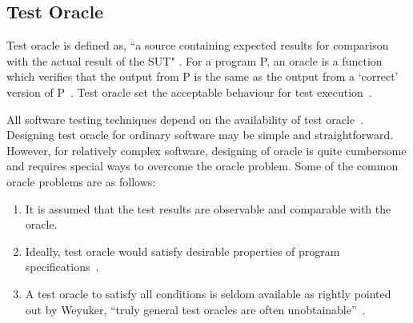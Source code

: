 



\subsection{Test Oracle}
Test oracle is defined as, ``a source containing expected results for comparison with the actual result of the SUT" \cite{ahmed2010software}. For a program P, an oracle is a function which verifies that the output from P is the same as the output from a ‘correct’ version of P~\cite{howden1986}. Test oracle set the acceptable behaviour for test execution~\cite{baresi2001test}. 

All software testing techniques depend on the availability of test oracle~\cite{gaudel2010software}. Designing test oracle for ordinary software may be simple and straightforward. However, for relatively complex software, designing of oracle is quite cumbersome and requires special ways to overcome the oracle problem. Some of the common oracle problems are as follows:
\begin{enumerate}
\item It is assumed that the test results are observable and comparable with the oracle.
\item Ideally, test oracle would satisfy desirable properties of program specifications~\cite{baresi2001test}.
\item A test oracle to satisfy all conditions is seldom available as rightly pointed out by Weyuker, ``truly general test oracles are often unobtainable''~\cite{weyuker1982testing}. 
\end{enumerate}

